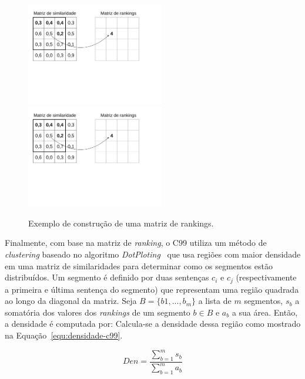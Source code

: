 \begin{figure}[!h]
	\centering     %

		\includegraphics[trim={ 10 250 80 40 },clip,page=1,width=60mm]{conteudo/capitulos/figs/c99-matrizes.pdf}
		\includegraphics[trim={ 10 250 80 40 },clip,page=2,width=60mm]{conteudo/capitulos/figs/c99-matrizes.pdf}
	\caption{Exemplo de construção de uma matriz de rankings.%
	}
	\label{fig:exemplomatrixrank}
\end{figure}


Finalmente, com base na matriz de \textit{ranking}, o C99 utiliza um método de \textit{clustering} baseado no algoritmo \textit{DotPloting}~\cite{Reynar1998} que usa regiões com maior densidade em uma matriz de similaridades para determinar como os segmentos estão distribuídos.  
% 
Um segmento é definido por duas sentenças $c_i$ e $c_j$ (respectivamente a primeira e última sentença do segmento) que representam uma região quadrada ao longo da diagonal da matriz. 
% 
Seja $B = \{b1,...,b_m\}$ a lista de $m$ segmentos,  $s_b$ a somatória dos valores dos \textit{rankings} de um segmento $b \in B$ e $a_b$ a sua área. Então, a densidade é computada por: 
% 
Calcula-se a densidade dessa região como mostrado na Equação~\ref{equ:densidade-c99}. 



\begin{equation}
Den = \frac{\sum_{b=1}^m s_b}{\sum_{b=1}^m a_b}
\label{equ:densidade-c99}
\end{equation}


